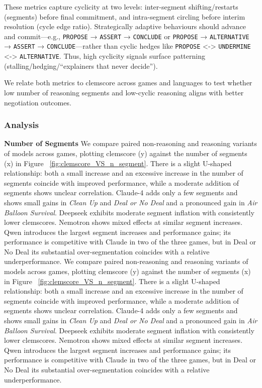 \documentclass[../main.tex]{subfiles}
\begin{document}
These metrics capture cyclicity at two levels: inter-segment shifting/restarts (segments) before final commitment, and intra-segment circling before interim resolution (cycle edge ratio). Strategically adaptive behaviours should advance and commit—e.g., \texttt{PROPOSE} → \texttt{ASSERT} → \texttt{CONCLUDE} or \texttt{PROPOSE} → \texttt{ALTERNATIVE} → \texttt{ASSERT} → \texttt{CONCLUDE}—rather than cyclic hedges like \texttt{PROPOSE} <-> \texttt{UNDERMINE} <-> \texttt{ALTERNATIVE}. Thus, high cyclicity signals surface patterning (stalling/hedging/“explainers that never decide”).

We relate both metrics to clemscore across games and languages to test whether low number of reasoning segments and low-cyclic reasoning aligns with better negotiation outcomes.

\subsubsection{Analysis}

\textbf{Number of Segments}
We compare paired non-reasoning and reasoning variants of models across games, plotting clemscore (y) against the number of segments (x) in Figure ~\ref{fig:clemscore_VS_n_segment}. There is a slight U-shaped relationship: both a small increase and an excessive increase in the number of segments coincide with improved performance, while a moderate addition of segments shows unclear correlation. Claude-4 adds only a few segments and shows small gains in \textit{Clean Up} and \textit{Deal or No Deal} and a pronounced gain in \textit{Air Balloon Survival}. Deepseek exhibits moderate segment inflation with consistently lower clemscores. Nemotron shows mixed effects at similar segment increases. Qwen introduces the largest segment increases and performance gains; its performance is competitive with Claude in two of the three games, but in Deal or No Deal its substantial over-segmentation coincides with a relative underperformance.
We compare paired non-reasoning and reasoning variants of models across games, plotting clemscore (y) against the number of segments (x) in Figure ~\ref{fig:clemscore_VS_n_segment}. There is a slight U-shaped relationship: both a small increase and an excessive increase in the number of segments coincide with improved performance, while a moderate addition of segments shows unclear correlation. Claude-4 adds only a few segments and shows small gains in \textit{Clean Up} and \textit{Deal or No Deal} and a pronounced gain in \textit{Air Balloon Survival}. Deepseek exhibits moderate segment inflation with consistently lower clemscores. Nemotron shows mixed effects at similar segment increases. Qwen introduces the largest segment increases and performance gains; its performance is competitive with Claude in two of the three games, but in Deal or No Deal its substantial over-segmentation coincides with a relative underperformance.
\end{document}

